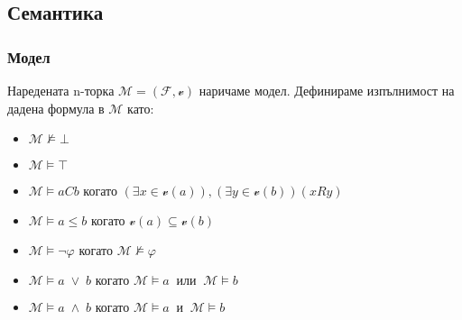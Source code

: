 \documentclass{beamer}
\begin{document}
\subsection{Семантика}
\begin{frame}\frametitle{Модел}
	Наредената n-торка $\mathcal{M} = (\mathcal{F}, \mathscr{v})$ наричаме модел. Дефинираме изпълнимост на дадена формула в $\mathcal{M}$ като:
		\begin{itemize}
			\item $\mathcal{M} \not\models \bot$ 
			\item $\mathcal{M} \models \top$
			\item $\mathcal{M} \models aCb \text{ когато } (\exists x \in \mathscr{v}(a)), (\exists y \in \mathscr{v}(b)) (xRy)$
			\item $\mathcal{M} \models a \leq b \text{ когато } \mathscr{v}(a) \subseteq \mathscr{v}(b)$
			\item $\mathcal{M} \models \neg \varphi \text{ когато } \mathcal{M} \not\models \varphi$
			\item $\mathcal{M} \models a \; \vee \; b \text{ когато } \mathcal{M} \models a \: \textit{ или } \: \mathcal{M} \models b$
			\item $\mathcal{M} \models a \; \wedge \; b \text{ когато } \mathcal{M} \models a \: \textit{ и } \: \mathcal{M} \models b$
		\end{itemize}
	
\end{frame}
\end{document}
